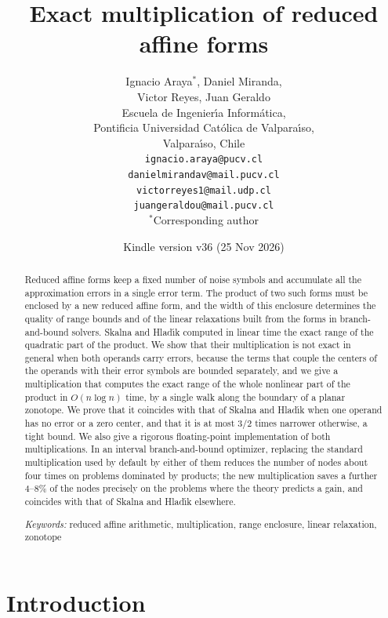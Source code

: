\documentclass[10pt]{article}
\title{Exact multiplication of reduced affine forms}
\author{Ignacio Araya$^{*}$, Daniel Miranda,\\ Victor Reyes, Juan Geraldo\\[2mm]
\small Escuela de Ingenier\'{\i}a Inform\'atica,\\ \small Pontificia Universidad Cat\'olica de Valpara\'{\i}so,\\ \small Valpara\'{\i}so, Chile\\[1mm]
\small \texttt{ignacio.araya@pucv.cl}\\ \small \texttt{danielmirandav@mail.pucv.cl}\\ \small \texttt{victorreyes1@mail.udp.cl}\\ \small \texttt{juangeraldou@mail.pucv.cl}\\[1mm]
\small $^{*}$Corresponding author}
\date{\small Kindle version v36 (25 Nov 2026)}
\theoremstyle{definition}
\begin{document}
\maketitle

\begin{abstract}
Reduced affine forms keep a fixed number of noise symbols and accumulate all the approximation errors in a single error term. The product of two such forms must be enclosed by a new reduced affine form, and the width of this enclosure determines the quality of range bounds and of the linear relaxations built from the forms in branch-and-bound solvers. Skalna and Hlad\'{\i}k computed in linear time the exact range of the quadratic part of the product. We show that their multiplication is not exact in general when both operands carry errors, because the terms that couple the centers of the operands with their error symbols are bounded separately, and we give a multiplication that computes the exact range of the whole nonlinear part of the product in $O(n\log n)$ time, by a single walk along the boundary of a planar zonotope. We prove that it coincides with that of Skalna and Hlad\'{\i}k when one operand has no error or a zero center, and that it is at most $3/2$ times narrower otherwise, a tight bound. We also give a rigorous floating-point implementation of both multiplications. In an interval branch-and-bound optimizer, replacing the standard multiplication used by default by either of them reduces the number of nodes about four times on problems dominated by products; the new multiplication saves a further 4--8\% of the nodes precisely on the problems where the theory predicts a gain, and coincides with that of Skalna and Hlad\'{\i}k elsewhere.

\medskip\noindent
\textit{Keywords:} reduced affine arithmetic, multiplication, range enclosure, linear relaxation, zonotope
\end{abstract}

\section{Introduction}
\end{document}
